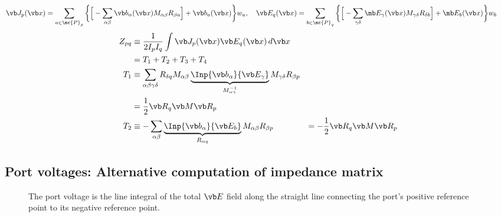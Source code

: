 \documentclass[letterpaper]{article}
\begin{document}
$$ \vb J_p(\vb x) =
   \sum_{a\in\mc{P}_p}
   \bigg\{ \Big[ 
     -\sum_{\alpha\beta} \vb b_\alpha(\vb x) M_{\alpha\beta} R_{\beta a}
           \Big]
           +\vb b_a(\vb x)
   \bigg\}w_a,
 \quad 
   \vb E_q(\vb x) =
   \sum_{b\in\mc{P}_q}
   \bigg\{ \Big[ 
     -\sum_{\gamma\delta} \mb E_\gamma(\vb x) M_{\gamma\delta} R_{\delta b}
           \Big]
           +\mb E_b(\vb x)
   \bigg\}w_b
 \qquad 
$$
\begin{align*}
 Z_{pq} 
 &\equiv \frac{1}{2I_p I_q}\int \vb J_p(\vb x) \vb E_q(\vb x)\,d\vb x
\\
 &= T_1 + T_2 + T_3 + T_4 
\\
 T_1 &\equiv \sum_{\alpha\beta\gamma\delta}
  R_{\delta q}
  M_{\alpha\beta}
 \underbrace{\Inp{\vb b_\alpha}{\vb E_\gamma}}_{M_{\alpha\gamma}^{-1}}
  M_{\gamma\delta}
  R_{\beta p}
\\
&= \frac{1}{2} \vb R_q \vb M \vb R_p
\\
 T_2 &\equiv -\sum_{\alpha\beta}
 \underbrace{\Inp{\vb b_\alpha}{\vb E_b}}_{R_{\alpha q}}
  M_{\alpha\beta}
  R_{\beta p}
 &= -\frac{1}{2}\vb R_q \vb M \vb R_p
\end{align*}

\newpage
\appendix
\subsection{Port voltages: Alternative computation of impedance matrix}
\begin{figure}
\begin{center}
\caption{The port voltage is the line integral of the total $\vb E$ 
         field along the straight line connecting the port's 
         positive reference point to its negative reference point.
        }
\label{LineIntegralFigure}
\end{center}
\end{figure}
\end{document}
